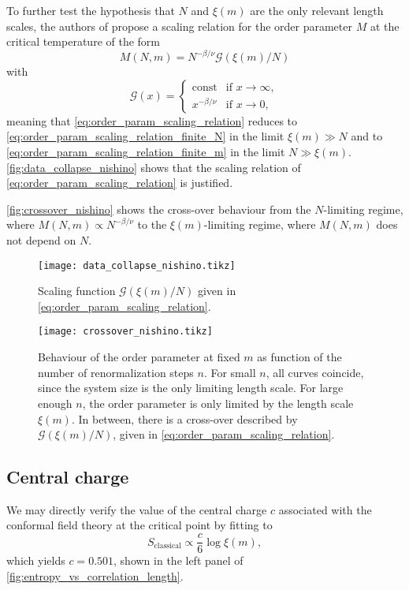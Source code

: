 To further test the hypothesis that $N$ and $\xi(m)$ are the only relevant length scales,
the authors of \cite{nishino1996numerical} propose a scaling relation for the order
parameter $M$ at the critical temperature of the form
\begin{equation}\label{eq:order_param_scaling_relation}
  M(N, m) = N^{-\beta/\nu} \mathcal{G}(\xi(m) / N)
\end{equation}
with
\begin{equation}
  \mathcal{G}(x) =
  \begin{cases}
    \text{const} & \text{if } x \to \infty, \\
    x^{-\beta/\nu} & \text{if } x \to 0,
  \end{cases}
\end{equation}
meaning that \autoref{eq:order_param_scaling_relation} reduces to
\autoref{eq:order_param_scaling_relation_finite_N} in the limit $\xi(m) \gg N$ and to
\autoref{eq:order_param_scaling_relation_finite_m} in the limit $N \gg \xi(m)$.
\autoref{fig:data_collapse_nishino} shows that the scaling relation of \autoref{eq:order_param_scaling_relation}
is justified.

\autoref{fig:crossover_nishino} shows the cross-over behaviour from the $N$-limiting regime, where
$M(N, m) \propto N^{-\beta/\nu}$ to the $\xi(m)$-limiting regime, where $M(N, m)$ does not depend on $N$.

\begin{figure}
  \texttt{[image: data\_collapse\_nishino.tikz]}
  \caption{Scaling function $\mathcal{G}(\xi(m)/N)$ given in
  \autoref{eq:order_param_scaling_relation}.}\label{fig:data_collapse_nishino}
\end{figure}

\begin{figure}
  \texttt{[image: crossover\_nishino.tikz]}
  \caption{Behaviour of the order parameter at fixed $m$ as function of
  the number of renormalization steps $n$. For small $n$, all curves coincide, since the system size is the only
  limiting length scale. For large enough $n$, the order parameter is only limited by the length scale
  $\xi(m)$. In between, there is a cross-over described by $\mathcal{G}(\xi(m)/N)$, given in
  \autoref{eq:order_param_scaling_relation}.}\label{fig:crossover_nishino}
\end{figure}

\subsection{Central charge}
We may directly verify the value of the central charge $c$ associated with the conformal field theory at the critical
point by fitting to
\begin{equation}\label{eq:entropy_vs_correlation_length}
  S_{\text{classical}} \propto \frac{c}{6} \log \xi(m),
\end{equation}
which yields $c = 0.501$, shown in the left panel of \autoref{fig:entropy_vs_correlation_length}.

